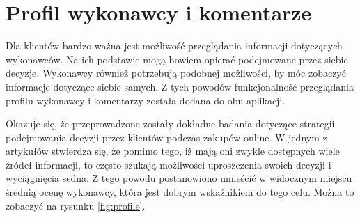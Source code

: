 \section{Profil wykonawcy i komentarze}

Dla klientów bardzo ważna jest możliwość przeglądania informacji dotyczących wykonawców. Na ich podstawie mogą bowiem opierać podejmowane przez siebie decyzje. Wykonawcy również potrzebują podobnej możliwości, by móc zobaczyć informacje dotyczące siebie samych. Z tych powodów funkcjonalność przeglądania profilu wykonawcy i komentarzy została dodana do obu aplikacji.

Okazuje się, że przeprowadzone zostały dokładne badania dotyczące strategii podejmowania decyzji przez klientów podczas zakupów online. W jednym z artykułów \cite{ratings-presentation} stwierdza się, że pomimo tego, iż mają oni zwykle dostępnych wiele źródeł informacji, to często szukają możliwości uproszczenia swoich decyzji i wyciągnięcia sedna. Z tego powodu postanowiono umieścić w widocznym miejscu średnią ocenę wykonawcy, która jest dobrym wskaźnikiem do tego celu. Można to zobaczyć na rysunku \ref{fig:profile}.

